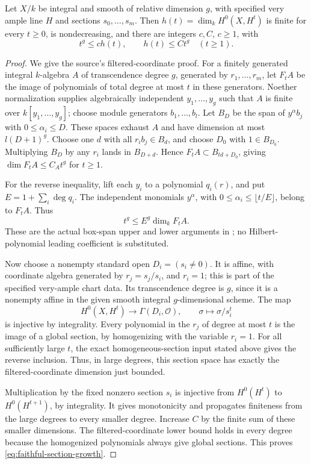 \begin{srlemma}\label{lem:faithful-section-growth}
Let \(X/k\) be integral and smooth of relative dimension \(g\),
with specified very ample line \(H\) and sections
\(s_0,\ldots,s_m\).
Then \(h(t)=\dim_kH^0(X,H^t)\) is finite for every \(t\ge0\),
is nondecreasing, and there are integers \(c,C\), \(c\ge1\), with
\[
                    t^g\le c h(t),\qquad h(t)\le Ct^g
                        \quad(t\ge1).
 \tag{DG1}\label{eq:faithful-section-growth}
\]
\end{srlemma}
\begin{proof}
We give the source's filtered-coordinate proof.
For a finitely generated integral \(k\)-algebra \(A\) of
transcendence degree \(g\), generated by \(r_1,\ldots,r_m\),
let \(F_tA\) be the image of polynomials of total degree
at most \(t\) in these generators.
Noether normalization supplies algebraically independent
\(y_1,\ldots,y_g\) such that \(A\) is finite over
\(k[y_1,\ldots,y_g]\); choose module generators \(b_1,\ldots,b_l\).
Let \(B_D\) be the span of \(y^\alpha b_j\) with
\(0\le\alpha_i\le D\).
These spaces exhaust \(A\) and have dimension at most
\(l(D+1)^g\).
Choose one \(d\) with all \(r_i b_j\in B_d\), and choose
\(D_0\) with \(1\in B_{D_0}\).
Multiplying \(B_D\) by any \(r_i\) lands in \(B_{D+d}\).
Hence \(F_tA\subset B_{td+D_0}\), giving
\(\dim F_tA\le C_A t^g\) for \(t\ge1\).

For the reverse inequality, lift each \(y_i\) to a polynomial
\(q_i(r)\), and put \(E=1+\sum_i\deg q_i\).
The independent monomials \(y^\alpha\), with
\(0\le\alpha_i\le\lfloor t/E\rfloor\), belong to \(F_tA\).
Thus
\[
             t^g\le E^g\dim_kF_tA .
\]
These are the actual box-span upper and lower arguments in
; no Hilbert-polynomial
leading coefficient is substituted.

Now choose a nonempty standard open \(D_i=(s_i\ne0)\).
It is affine, with coordinate algebra generated by
\(r_j=s_j/s_i\), and \(r_i=1\); this is part of the specified
very-ample chart data.
Its transcendence degree is \(g\), since it is a nonempty
affine in the given smooth integral \(g\)-dimensional scheme.
The map
\[
      H^0(X,H^t)\longrightarrow\Gamma(D_i,\mathcal O),
                         \qquad \sigma\longmapsto\sigma/s_i^t
\]
is injective by integrality.
Every polynomial in the \(r_j\) of degree at most \(t\)
is the image of a global section, by homogenizing with the
variable \(r_i=1\).
For all sufficiently large \(t\), the exact homogeneous-section
input stated above gives the reverse inclusion.
Thus, in large degrees, this section space has exactly the
filtered-coordinate dimension just bounded.

Multiplication by the fixed nonzero section \(s_i\) is injective
from \(H^0(H^t)\) to \(H^0(H^{t+1})\), by integrality.
It gives monotonicity and propagates finiteness from the large
degrees to every smaller degree.
Increase \(C\) by the finite sum of these smaller dimensions.
The filtered-coordinate lower bound holds in every degree
because the homogenized polynomials always give global sections.
This proves \eqref{eq:faithful-section-growth}.
\end{proof}

